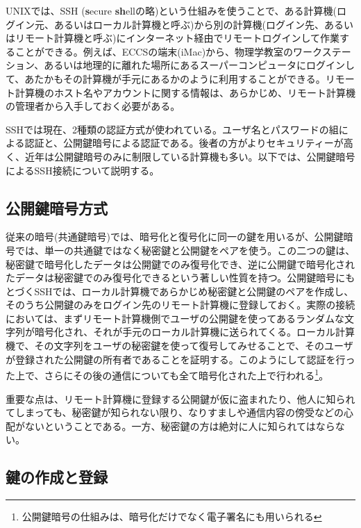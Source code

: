 UNIXでは、SSH ({\bf s}ecure {\bf sh}ellの略)という仕組みを使うことで、ある計算機(ログイン元、あるいはローカル計算機と呼ぶ)から別の計算機(ログイン先、あるいはリモート計算機と呼ぶ)にインターネット経由でリモートログインして作業することができる。例えば、ECCSの端末(iMac)から、物理学教室のワークステーション、あるいは地理的に離れた場所にあるスーパーコンピュータにログインして、あたかもその計算機が手元にあるかのように利用することができる。リモート計算機のホスト名やアカウントに関する情報は、あらかじめ、リモート計算機の管理者から入手しておく必要がある。

SSHでは現在、2種類の認証方式が使われている。ユーザ名とパスワードの組による認証と、公開鍵暗号による認証である。後者の方がよりセキュリティーが高く、近年は公開鍵暗号のみに制限している計算機も多い。以下では、公開鍵暗号によるSSH接続について説明する。

\subsection{公開鍵暗号方式}

従来の暗号(共通鍵暗号)では、暗号化と復号化に同一の鍵を用いるが、公開鍵暗号では、単一の共通鍵ではなく秘密鍵と公開鍵をペアを使う。この二つの鍵は、秘密鍵で暗号化したデータは公開鍵でのみ復号化でき、逆に公開鍵で暗号化されたデータは秘密鍵でのみ復号化できるという著しい性質を持つ。公開鍵暗号にもとづくSSHでは、ローカル計算機であらかじめ秘密鍵と公開鍵のペアを作成し、そのうち公開鍵のみをログイン先のリモート計算機に登録しておく。実際の接続においては、まずリモート計算機側でユーザの公開鍵を使ってあるランダムな文字列が暗号化され、それが手元のローカル計算機に送られてくる。ローカル計算機で、その文字列をユーザの秘密鍵を使って復号してみせることで、そのユーザが登録された公開鍵の所有者であることを証明する。このようにして認証を行った上で、さらにその後の通信についても全て暗号化された上で行われる\footnote{公開鍵暗号の仕組みは、暗号化だけでなく電子署名にも用いられる}。

重要な点は、リモート計算機に登録する公開鍵が仮に盗まれたり、他人に知られてしまっても、秘密鍵が知られない限り、なりすましや通信内容の傍受などの心配がないということである。一方、秘密鍵の方は絶対に人に知られてはならない。

\subsection{鍵の作成と登録}

